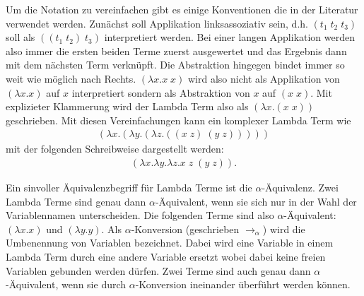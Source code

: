\documentclass[ngerman]{article}
\newcommand{\doublelinebreak}{\par\vspace{\baselineskip}}
\begin{document}
\doublelinebreak
Um die Notation zu vereinfachen gibt es einige Konventionen die in der Literatur verwendet werden.
Zunächst soll Applikation linksassoziativ sein, d.h. $(t_1 \; t_2 \; t_3)$ soll als $((t_1 \; t_2) \; t_3)$ interpretiert werden. Bei einer langen Applikation werden also immer die ersten beiden Terme zuerst ausgewertet und das Ergebnis dann mit dem nächsten Term verknüpft. Die Abstraktion hingegen bindet immer so weit wie möglich nach Rechts. $(\lambda x.x \; x)$ wird also nicht als Applikation von $(\lambda x.x)$ auf $x$ interpretiert sondern als Abstraktion von $x$ auf $(x \; x)$. Mit explizieter Klammerung wird der Lambda Term also als $(\lambda x.(x \; x))$ geschrieben. Mit diesen Vereinfachungen kann ein komplexer Lambda Term wie
\begin{align*}
    (\lambda x.(\lambda y.(\lambda z.((x \; z) \; (y \; z)))))
\end{align*}
mit der folgenden Schreibweise dargestellt werden:
\begin{align*}
    (\lambda x. \lambda y. \lambda z. x \; z \; (y \; z)).
\end{align*}

\doublelinebreak

Ein sinvoller Äquivalenzbegriff für Lambda Terme ist die $\alpha$-Äquivalenz. Zwei Lambda Terme sind genau dann $\alpha$-Äquivalent, wenn sie sich nur in der Wahl der Variablennamen unterscheiden. Die folgenden Terme sind also $\alpha$-Äquivalent: $(\lambda x.x)$ und $(\lambda y.y)$.
Als $\alpha$-Konversion (geschrieben $\rightarrow_\alpha$) wird die Umbenennung von Variablen bezeichnet. Dabei wird eine Variable in einem Lambda Term durch eine andere Variable ersetzt wobei dabei keine freien Variablen gebunden werden dürfen. Zwei Terme sind auch genau dann $\alpha$-Äquivalent, wenn sie durch $\alpha$-Konversion ineinander überführt werden können.
\end{document}
